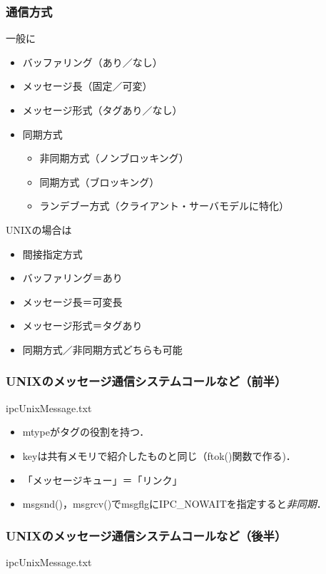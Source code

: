 \documentclass[unicode,handout]{beamer}                   %
\begin{document}
\begin{frame}
  \frametitle{通信方式}
  一般に
  \begin{itemize}
  \item バッファリング（あり／なし）
  \item メッセージ長（固定／可変）
  \item メッセージ形式（タグあり／なし）
  \item 同期方式
    \begin{itemize}
    \item 非同期方式（ノンブロッキング）
    \item 同期方式（ブロッキング）
    \item ランデブー方式（クライアント・サーバモデルに特化）
    \end{itemize}
  \end{itemize}

  UNIXの場合は
  \begin{itemize}
  \item 間接指定方式
  \item バッファリング＝あり
  \item メッセージ長＝可変長
  \item メッセージ形式＝タグあり
  \item 同期方式／非同期方式どちらも可能
  \end{itemize}
\end{frame}

\begin{frame}
  \frametitle{UNIXのメッセージ通信システムコールなど（前半）}
      {ipcUnixMessage.txt}
  \begin{itemize}
  \item mtypeがタグの役割を持つ．
  \item keyは共有メモリで紹介したものと同じ（ftok()関数で作る)．
  \item 「メッセージキュー」＝「リンク」
  \item msgsnd()，msgrcv()でmsgflgにIPC\_NOWAITを指定すると\emph{非同期}．
  \end{itemize}
\end{frame}

\begin{frame}
  \frametitle{UNIXのメッセージ通信システムコールなど（後半）}
      {ipcUnixMessage.txt}
\end{frame}
\end{document}

